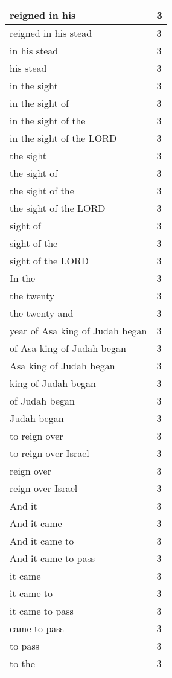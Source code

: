 \begin{center}
\begin{longtable}{|p{3.0in}|p{0.5in}|}
reigned in his & 3\\ \hline 
reigned in his stead & 3\\ \hline 
in his stead & 3\\ \hline 
his stead & 3\\ \hline 
in the sight & 3\\ \hline 
in the sight of & 3\\ \hline 
in the sight of the & 3\\ \hline 
in the sight of the LORD & 3\\ \hline 
the sight & 3\\ \hline 
the sight of & 3\\ \hline 
the sight of the & 3\\ \hline 
the sight of the LORD & 3\\ \hline 
sight of & 3\\ \hline 
sight of the & 3\\ \hline 
sight of the LORD & 3\\ \hline 
In the & 3\\ \hline 
the twenty & 3\\ \hline 
the twenty and & 3\\ \hline 
year of Asa king of Judah began & 3\\ \hline 
of Asa king of Judah began & 3\\ \hline 
Asa king of Judah began & 3\\ \hline 
king of Judah began & 3\\ \hline 
of Judah began & 3\\ \hline 
Judah began & 3\\ \hline 
to reign over & 3\\ \hline 
to reign over Israel & 3\\ \hline 
reign over & 3\\ \hline 
reign over Israel & 3\\ \hline 
And it & 3\\ \hline 
And it came & 3\\ \hline 
And it came to & 3\\ \hline 
And it came to pass & 3\\ \hline 
it came & 3\\ \hline 
it came to & 3\\ \hline 
it came to pass & 3\\ \hline 
came to pass & 3\\ \hline 
to pass & 3\\ \hline 
to the & 3\\ \hline 

\end{longtable}
\end{center}
